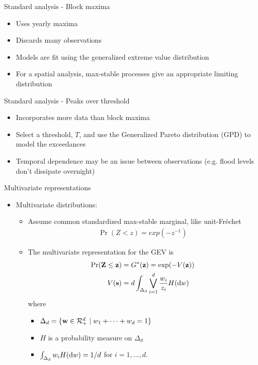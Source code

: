 \documentclass{beamer}
\begin{document}
\begin{frame}{Standard analysis - Block maxima}
  \begin{itemize} \setlength{\itemsep}{0.5em}
      \item Uses yearly maxima
      \item Discards many observations
      \item Models are fit using the generalized extreme value distribution
    \item For a spatial analysis, max-stable processes give an appropriate limiting distribution
  \end{itemize}
\end{frame}

\begin{frame}{Standard analysis - Peaks over threshold}
  \begin{itemize}  \setlength{\itemsep}{0.5em}
      \item Incorporates more data than block maxima
      \item Select a threshold, $T$, and use the Generalized Pareto distribution (GPD) to model the exceedances
      \item Temporal dependence may be an issue between observations (e.g. flood levels don't dissipate overnight)
  \end{itemize}
\end{frame}

\begin{frame}{Multivariate representations}
  \begin{itemize}
    \item Multivariate distributions:
    \begin{itemize}
      \item Assume common standardized max-stable marginal, like unit-Fr\'{e}chet
      \begin{align*}
        \Pr(Z < z) = exp(-z^{-1})
      \end{align*}
      \item The multivariate representation for the GEV is
      \begin{align*}
        \Pr(\mbox{\bf Z} \le \mbox{\bf z})  &= G^*(\mbox{\bf z}) = \exp(-V(\mbox{\bf z}))\\
                V(\mbox{\bf s})    &= d \int_{\Delta_d} \bigvee_{i = 1}^d \frac{w_i}{z_i} H(\text{d} w)
      \end{align*}
      where
      \begin{itemize}
        \item $\Delta_d = \{ \mbox{\bf w} \in {\cal R}^d_+ \mid w_1 + \cdots + w_d = 1\}$
        \item $H$ is a probability measure on $\Delta_d$
        \item $\int_{\Delta_d}w_i H(\text{d} w) = 1 / d$ for $i = 1, \ldots, d$.
      \end{itemize}
    \end{itemize}
  \end{itemize}
\end{frame}
\end{document}
